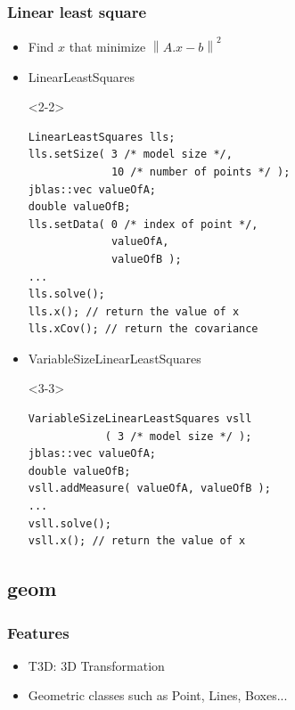 \documentclass[compress]{beamer}
\begin{document}

\begin{frame}[fragile]
  \frametitle{Linear least square}
  \begin{itemize}
    \item<1-> Find $ x $ that minimize $ \left\| A.x - b \right\|^2 $
    \item<2-> LinearLeastSquares
      \begin{onlyenv}<2-2>
        \begin{lstlisting}
LinearLeastSquares lls;
lls.setSize( 3 /* model size */,
             10 /* number of points */ );
jblas::vec valueOfA;
double valueOfB;
lls.setData( 0 /* index of point */,
             valueOfA,
             valueOfB );
...
lls.solve();
lls.x(); // return the value of x
lls.xCov(); // return the covariance
        \end{lstlisting}
      \end{onlyenv}
    \item<3-> VariableSizeLinearLeastSquares
      \begin{onlyenv}<3-3>
        \begin{lstlisting}
VariableSizeLinearLeastSquares vsll
            ( 3 /* model size */ );
jblas::vec valueOfA;
double valueOfB;
vsll.addMeasure( valueOfA, valueOfB );
...
vsll.solve();
vsll.x(); // return the value of x
        \end{lstlisting}
      \end{onlyenv}
  \end{itemize}

\end{frame}


\subsection{geom}
\begin{frame}
  \frametitle{Features}
  \begin{itemize}
   \item<1-> T3D: 3D Transformation
   \item<2-> Geometric classes such as Point, Lines, Boxes...
  \end{itemize}
\end{frame}
\end{document}
